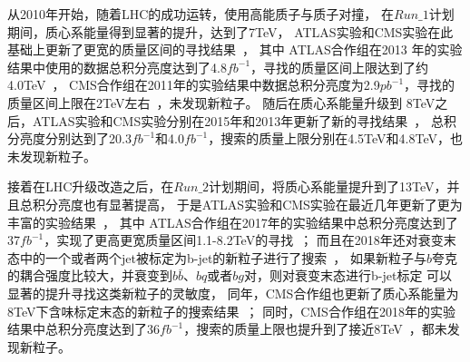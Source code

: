 从2010年开始，随着LHC的成功运转，使用高能质子与质子对撞，
在$Run\_1$计划期间，质心系能量得到显著的提升，达到了7TeV，
ATLAS实验和CMS实验在此基础上更新了更宽的质量区间的寻找结果~\cite{ATLASDijet1,ATLASDijet2,ATLASDijet3,ATLASDijet4,CMSDijet1,CMSDijet2}，
其中 ATLAS合作组在2013 年的实验结果中使用的数据总积分亮度达到了4.8$fb^{-1}$，寻找的质量区间上限达到了约4.0TeV~\cite{ATLASDijet4}，
CMS合作组在2011年的实验结果中数据总积分亮度为2.9$pb^{-1}$，寻找的质量区间上限在2TeV左右~\cite{CMSDijet2}，未发现新粒子。
随后在质心系能量升级到 8TeV之后，ATLAS实验和CMS实验分别在2015年和2013年更新了新的寻找结果~\cite{ATLASDijet5,CMSDijet3}，
总积分亮度分别达到了20.3$fb^{-1}$和4.0$fb^{-1}$，搜索的质量上限分别在4.5TeV和4.8TeV，也未发现新粒子。

接着在LHC升级改造之后，在$Run\_2$计划期间，将质心系能量提升到了13TeV，并且总积分亮度也有显著提高，
于是ATLAS实验和CMS实验在最近几年更新了更为丰富的实验结果~\cite{ATLASDijet6,ATLASDijet7,ATLASDijet8,ATLASDijet9,CMSDijet4,CMSDijet5,CMSDijet6}，
其中 ATLAS合作组在2017年的实验结果中总积分亮度达到了37$fb^{-1}$，实现了更高更宽质量区间1.1-8.2TeV的寻找~\cite{ATLASDijet8}；
而且在2018年还对衰变末态中的一个或者两个jet被标定为b-jet的新粒子进行了搜索~\cite{ATLASDijet9}，
如果新粒子与$b$夸克的耦合强度比较大，并衰变到$b\bar{b}$、$bq$或者$bg$对，则对衰变末态进行b-jet标定
可以显著的提升寻找这类新粒子的灵敏度，
同年，CMS合作组也更新了质心系能量为8TeV下含味标定末态的新粒子的搜索结果~\cite{CMSDijet7}；
同时，CMS合作组在2018年的实验结果中总积分亮度达到了36$fb^{-1}$，搜索的质量上限也提升到了接近8TeV~\cite{CMSDijet6}，都未发现新粒子。

